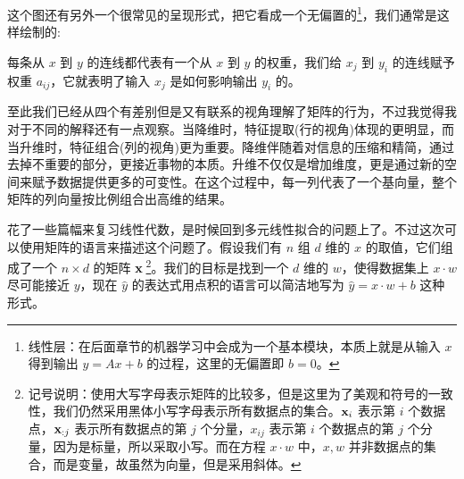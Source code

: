 这个图还有另外一个很常见的呈现形式，把它看成一个无偏置的\footnote{线性层：在后面章节的机器学习中会成为一个基本模块，本质上就是从输入 $x$ 得到输出 $y=Ax + b$ 的过程，这里的无偏置即 $b=0$。}，我们通常是这样绘制的:
\begin{figure}[H]
    \centering
\end{figure}

每条从 $x$ 到 $y$ 的连线都代表有一个从 $x$ 到 $y$ 的权重，我们给 $x_j$ 到 $y_i$ 的连线赋予权重 $a_{ij}$，它就表明了输入 $x_j$ 是如何影响输出 $y_i$ 的。

至此我们已经从四个有差别但是又有联系的视角理解了矩阵的行为，不过我觉得我对于不同的解释还有一点观察。当降维时，特征提取(行的视角)体现的更明显，而当升维时，特征组合(列的视角)更为重要。降维伴随着对信息的压缩和精简，通过去掉不重要的部分，更接近事物的本质。升维不仅仅是增加维度，更是通过新的空间来赋予数据提供更多的可变性。在这个过程中，每一列代表了一个基向量，整个矩阵的列向量按比例组合出高维的结果。

花了一些篇幅来复习线性代数，是时候回到多元线性拟合的问题上了。不过这次可以使用矩阵的语言来描述这个问题了。假设我们有 $n$ 组 $d$ 维的 $x$ 的取值，它们组成了一个 $n\times d$ 的矩阵 ${\mathbf{x}}$\,\footnote{记号说明：使用大写字母表示矩阵的比较多，但是这里为了美观和符号的一致性，我们仍然采用黑体小写字母表示所有数据点的集合。${\mathbf{x}}_i$ 表示第 $i$ 个数据点，${\mathbf{x}}_{:j}$ 表示所有数据点的第 $j$ 个分量，$x_{ij}$ 表示第 $i$ 个数据点的第 $j$ 个分量，因为是标量，所以采取小写。而在方程 $x\cdot w$ 中，$x,w$ 并非数据点的集合，而是变量，故虽然为向量，但是采用斜体。}。我们的目标是找到一个 $d$ 维的 $w$，使得数据集上 $x\cdot w$ 尽可能接近 $y$，现在 $\hat y$ 的表达式用点积的语言可以简洁地写为 $\hat y = x\cdot w + b$ 这种形式。

